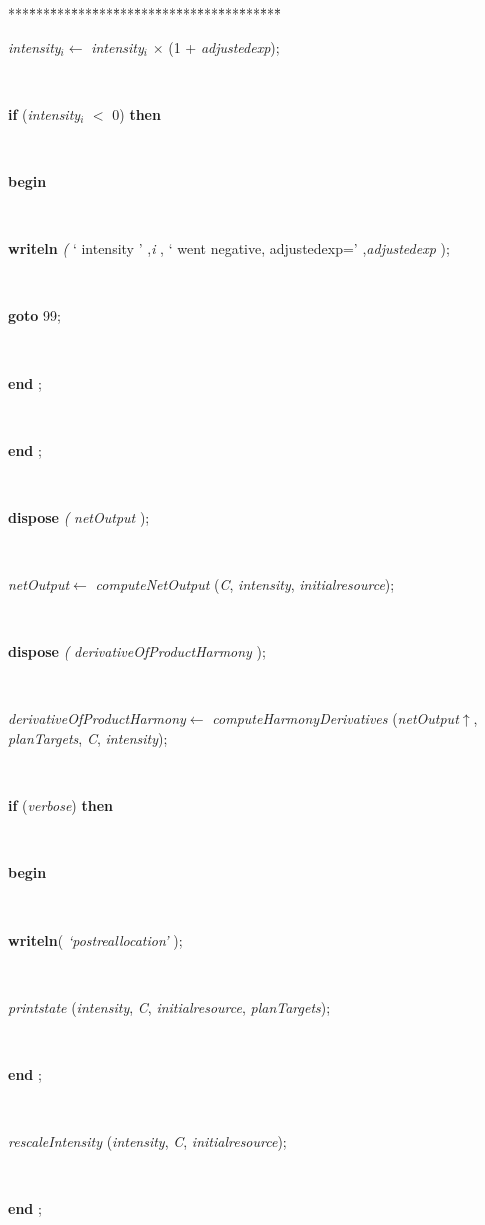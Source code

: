 \begin{tabbing}
***\=***\=***\=***\=***\=***\=***\=***\=***\=***\=***\=***\=***\=\kill
\+ \+ \\
\parbox{14cm}{\textsf{\textit{intensity}$_{\textit{i}}$$\leftarrow$ \textit{intensity}$_{\textit{i}}$ $\times$ (1 + \textit{adjustedexp})}; }\\
\+\parbox{14cm}{\textsf {\textbf {if } \textsf{(\textit{intensity}$_{\textit{i}}$ $<$ 0)} \textbf{ then } }}\\
\<\parbox{14cm}{\textsf{\textbf{begin} }}\\
\parbox{14cm}{\textsf{\textbf{writeln} \textit{(} \textrm{\textup { ` intensity ' } },\textit{i} ,\textrm{\textup { ` went negative, adjustedexp=' } } ,\textit{adjustedexp} );}}\\
\parbox{14cm}{\textsf {\textbf {goto } \textsf{99}; }}\\
\<\-\parbox{14cm}{\textsf{\textbf{end} ;}}\\
\<\-\parbox{14cm}{\textsf{\textbf{end} ;}}\\
\parbox{14cm}{\textsf{\textbf{dispose} \textit{(} \textit{netOutput} );}}\\
\parbox{14cm}{\textsf{\textit{netOutput}$\leftarrow$ \textit{computeNetOutput} (\textit{C}, \textit{intensity}, \textit{initialresource})}; }\\
\parbox{14cm}{\textsf{\textbf{dispose} \textit{(} \textit{derivativeOfProductHarmony} );}}\\
\parbox{14cm}{\textsf{\textit{derivativeOfProductHarmony}$\leftarrow$ \textit{computeHarmonyDerivatives} (\textit{netOutput}$\uparrow$\textit{}, \textit{planTargets}, \textit{C}, \textit{intensity})}; }\\
\+\parbox{14cm}{\textsf {\textbf {if } \textsf{(\textit{verbose})} \textbf{ then } }}\\
\<\parbox{14cm}{\textsf{\textbf{begin} }}\\
\parbox{14cm}{\textsf{\textbf{writeln}(\textit{\textrm{\textup { `postreallocation' } }})}; }\\
\parbox{14cm}{\textsf{\textit{printstate} (\textit{intensity}, \textit{C}, \textit{initialresource}, \textit{planTargets})}; }\\
\<\-\parbox{14cm}{\textsf{\textbf{end} ;}}\\
\parbox{14cm}{\textsf{\textit{rescaleIntensity} (\textit{intensity}, \textit{C}, \textit{initialresource})}; }\\
\<\-\parbox{14cm}{\textsf{\textbf{end} ;}}\\
\end{tabbing}
